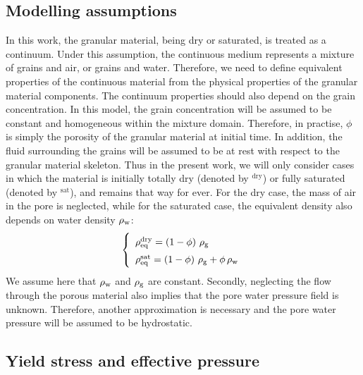 \documentclass{../GPUSPHtemplate}
\begin{document}
\subsection{Modelling assumptions}
\label{subsec:modellingAssumptions}
In this work, the granular material, being dry or saturated, is treated as a continuum. Under this assumption, the continuous medium represents a mixture of grains and air, or grains and water. Therefore, we need to define equivalent properties of the continuous material from the physical properties of the granular material components. The continuum properties should also depend on the grain concentration. In this model, the grain concentration will be assumed to be constant and homogeneous within the mixture domain. Therefore, in practise, $\phi$ is simply the porosity of the granular material at initial time.
%
In addition, the fluid surrounding the grains will be assumed to be at rest with respect to the granular material skeleton. Thus in the present work, we will only consider cases in which the material is initially totally dry (denoted by $^{\text{dry}}$) or fully saturated (denoted by $^{\text{sat}}$), and remains that way for ever. For the dry case, the mass of air in the pore is neglected, while for the saturated case, the equivalent density also depends on water density $\rho_{\text{w}}$:
%
\begin{equation}
\def\arraystretch{1.5}
\left\lbrace \begin{array}{l}
\rhoeq^{\text{dry}} = \left( 1 - \phi \right) \, \rhog \\
\rhoeq^{\text{sat}} = \left( 1 - \phi \right) \, \rhog + \phi \, \rhow
\end{array}\right.
\label{eq:eqDensity}
\end{equation}
%
We assume here that $\rho_{\text{w}}$ and $\rho_{\text{g}}$ are constant. Secondly, neglecting the flow through the porous material also implies that the pore water pressure field is unknown. Therefore, another approximation is necessary and the pore water pressure will be assumed to be hydrostatic.

\subsection{Yield stress and effective pressure}
\end{document}
